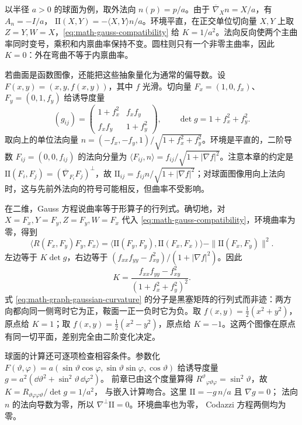 以半径 \(a>0\) 的球面为例，取外法向 \(n(p)=p/a\)。由于
\(\overline\nabla_Xn=X/a\)，有 \(A_n=-I/a\)，
\(\mathrm{II}(X,Y)=-\langle X,Y\rangle n/a\)。环境平直，在正交单位切向量 \(X,Y\) 上取 \(Z=Y,W=X\)，\cref{eq:math-gauss-compatibility} 给 \(K=1/a^2\)。法向反向使两个主曲率同时变号，乘积和内禀曲率保持不变。圆柱则只有一个非零主曲率，因此 \(K=0\)：外在弯曲不等于内禀曲率。

若曲面是函数图像，还能把这些抽象量化为通常的偏导数。设
\(F(x,y)=(x,y,f(x,y))\)，其中 \(f\) 光滑。切向量
\(F_x=(1,0,f_x)\)、\(F_y=(0,1,f_y)\) 给诱导度量
\[
(g_{ij})=\begin{pmatrix}1+f_x^2&f_xf_y\\f_xf_y&1+f_y^2\end{pmatrix},
\qquad \det g=1+f_x^2+f_y^2.
\]
取向上的单位法向量
\(n=(-f_x,-f_y,1)/\sqrt{1+f_x^2+f_y^2}\)。环境是平直的，二阶导数
\(F_{ij}=(0,0,f_{ij})\) 的法向分量为
\(\langle F_{ij},n\rangle=f_{ij}/\sqrt{1+|\nabla f|^2}\)。注意本章的约定是
\(\mathrm{II}(F_i,F_j)=(\overline\nabla_{F_i}F_j)^\perp\)，故
\(\mathrm{II}_{ij}=f_{ij}n/\sqrt{1+|\nabla f|^2}\)；对球面图像用向上法向时，这与先前外法向的符号可能相反，但曲率不受影响。

在二维，Gauss 方程说曲率等于形算子的行列式。确切地，对 \(X=F_x,Y=F_y,Z=F_y,W=F_x\) 代入 \cref{eq:math-gauss-compatibility}，环境曲率为零，得到
\[
\langle R(F_x,F_y)F_y,F_x\rangle
=\langle\mathrm{II}(F_y,F_y),\mathrm{II}(F_x,F_x)\rangle
-\|\mathrm{II}(F_x,F_y)\|^2.
\]
左边等于 \(K\det g\)，右边等于
\((f_{xx}f_{yy}-f_{xy}^2)/(1+|\nabla f|^2)\)。因此
\begin{equation}
\label{eq:math-graph-gaussian-curvature}
K=\frac{f_{xx}f_{yy}-f_{xy}^2}{(1+f_x^2+f_y^2)^2}.
\end{equation}
式 \cref{eq:math-graph-gaussian-curvature} 的分子是黑塞矩阵的行列式而非迹：两方向都向同一侧弯时它为正，鞍面一正一负时它为负。取 \(f(x,y)=\tfrac12(x^2+y^2)\)，原点给 \(K=1\)；取 \(f(x,y)=\tfrac12(x^2-y^2)\)，原点给 \(K=-1\)。这两个图像在原点有同一切平面，差别完全由二阶变化决定。

球面的计算还可逐项检查相容条件。参数化
\(F(\vartheta,\varphi)=a(\sin\vartheta\cos\varphi,
\sin\vartheta\sin\varphi,\cos\vartheta)\) 给诱导度量
\(g=a^2(\dd\vartheta^2+\sin^2\vartheta\,\dd\varphi^2)\)。
前章已由这个度量算得 \(R^\vartheta{}_{\varphi\vartheta\varphi}
=\sin^2\vartheta\)，故
\(K=R_{\vartheta\varphi\varphi\vartheta}/\det g=1/a^2\)，
与嵌入计算吻合。这里
\(\mathrm{II}=-g\,n/a\) 且 \(\nabla g=0\)；
法向 \(n\) 的法向导数为零，所以
\(\nabla^\perp\mathrm{II}=0\)。环境曲率也为零，
Codazzi 方程两侧均为零。

